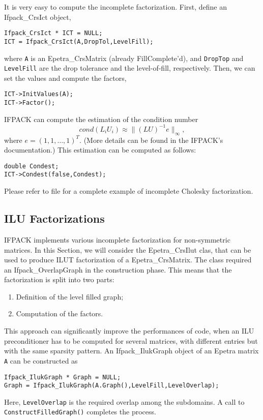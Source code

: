 It is very easy to compute the incomplete factorization. First, define
an Ifpack\_CrsIct object,
\begin{verbatim}
Ifpack_CrsIct * ICT = NULL;
ICT = Ifpack_CrsIct(A,DropTol,LevelFill);
\end{verbatim}
where \verb!A! is an Epetra\_CrsMatrix (already FillComplete'd), and
\verb!DropTop! and \verb!LevelFill! are the drop tolerance and the
level-of-fill, respectively. Then, we can set the values and compute the
factors,
\begin{verbatim}
ICT->InitValues(A);
ICT->Factor();
\end{verbatim}

IFPACK can compute the estimation of the condition number
\[
cond(L_i U_i) \approx \|(LU)^{-1} e \|_\infty ,
\]
where $e = (1,1,\dots,1)^T$. (More details can be found in the IFPACK's
documentation.) This estimation can be computed as follows:
\begin{verbatim}
double Condest;
ICT->Condest(false,Condest);
\end{verbatim}
Please refer to file  for a complete example of
incomplete Cholesky factorization.


\subsection{ILU  Factorizations}
\label{sec:ifpack_ilut}

IFPACK implements various incomplete factorization for non-symmetric
matrices. In this Section, we will consider the Epetra\_CrsIlut clas,
that can be used to produce ILUT factorization of a
Epetra\_CrsMatrix. The class required an Ifpack\_OverlapGraph in the
construction phase. This means that the factorization is split into two
parts:
\begin{enumerate}
\item Definition of the level filled graph;
\item Computation of the factors.
\end{enumerate}
This approach can significantly improve the performances of code, when
an ILU preconditioner has to be computed for several matrices, with
different entries but with the same sparsity pattern. An
Ifpack\_IlukGraph object of an Epetra matrix \verb!A! can be constructed
as
\begin{verbatim}
Ifpack_IlukGraph * Graph = NULL;
Graph = Ifpack_IlukGraph(A.Graph(),LevelFill,LevelOverlap);
\end{verbatim}
Here, \verb!LevelOverlap! is the required overlap among the subdomains.
A call to \verb!ConstructFilledGraph()! completes the process.

